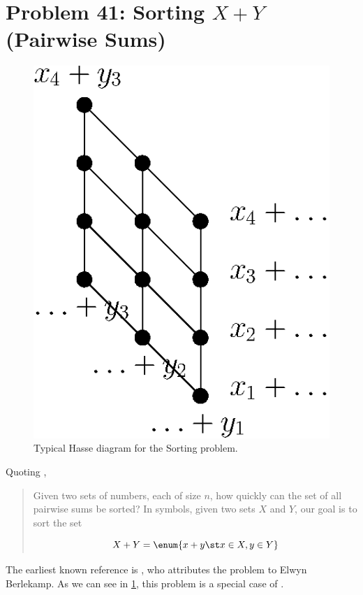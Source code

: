 

\section{Problem 41: Sorting $X + Y$ (Pairwise Sums)}
\label{tree:open:xy}

\begin{figure}
	\centering
	\includegraphics[height=0.2\textheight]{fig/open/x+y}
	\caption{Typical Hasse diagram for the Sorting \XY problem.}
	\label{fig:open:xy}
\end{figure}

Quoting \cite{orourke:2012:sortxy},

\begin{quotation}
Given two sets of numbers, each of size $n$, how quickly can the set of all
pairwise sums be sorted? In symbols, given two sets $X$ and $Y$, our goal is to
sort the set

$$ X + Y = \enum{x + y \st x \in X, y \in Y} $$

\end{quotation}

The earliest known reference is \citet*{fredman:1976}, who attributes
the problem to Elwyn Berlekamp. As we can see in \ref{fig:open:xy}, this
problem is a special case of .

